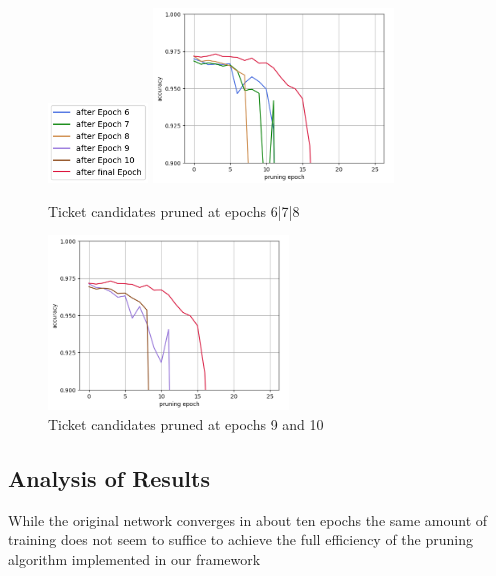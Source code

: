 \begin{figure}
	\begin{minipage}{\textwidth}
		\centering
		\includegraphics[width=100px]{gfx/7-Evaluation/LTH_6_legend.png}
	\end{minipage}
	\begin{minipage}{0.5\textwidth}
		\centering
		\includegraphics[height=175px]{gfx/Experiments/EarlyTicket-MNIST-FCN/678.png}
		\caption*{Ticket candidates pruned at epochs 6|7|8}
		\label{?}
	\end{minipage}\hfill
	\begin{minipage}{0.5\textwidth}
		\centering
		\includegraphics[height=175px]{gfx/Experiments/EarlyTicket-MNIST-FCN/910.png}
		\caption*{Ticket candidates pruned at epochs 9 and 10}
		\label{?}
	\end{minipage}
\end{figure}
\subsection*{Analysis of Results}
While the original network converges in about ten epochs the same amount of training does not seem to suffice to achieve the full efficiency of the pruning algorithm implemented in our framework
